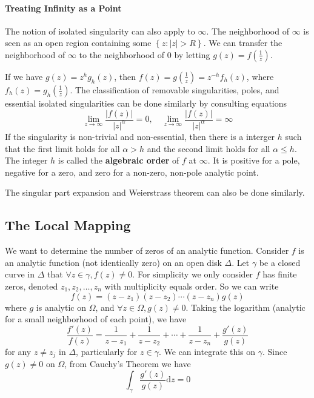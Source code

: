 \documentclass[../main.tex]{subfiles}
\begin{document}
\paragraph{Treating Infinity as a Point}
The notion of isolated singularity can also apply to $\infty $. The neighborhood of $\infty $ is seen as an open region containing some $\left\{ z: \left|z\right|>R \right\}$. We can transfer the neighborhood of $\infty $ to the neighborhood of $0$ by letting $\displaystyle g(z) = f(\frac{1}{z})$.

If we have $g(z) = z^hg_h(z)$, then $f(z) = g(\frac{1}{z}) = z^{-h}f_h(z)$, where $f_h(z) = g_h(\frac{1}{z})$. The classification of removable singularities, poles, and essential isolated singularities can be done similarly by consulting equations
\begin{equation*}
\lim_{z \to \infty} \frac{\left|f(z)\right|}{\left|z\right|^{\alpha}} = 0, \quad \lim_{z \to \infty} \frac{\left|f(z)\right|}{\left|z\right|^{\alpha}} = \infty
\end{equation*}
If the singularity is non-trivial and non-essential, then there is a interger $h$ such that the first limit holds for all $\alpha>h$ and the second limit holds for all $\alpha\leq h$. The integer $h$ is called the \textbf{algebraic order} of $f$ at $\infty $. It is positive for a pole, negative for a zero, and zero for a non-zero, non-pole analytic point.

The singular part expansion and Weierstrass theorem can also be done similarly.


\subsection{The Local Mapping}
We want to determine the number of zeros of an analytic function. Consider $f$ is an analytic function (not identically zero) on an open disk  $\Delta$. Let $\gamma$ be a closed curve in $\Delta$ that $\forall z\in \gamma, f(z)\neq 0$. For simplicity we only consider $f$ has finite zeros, denoted $z_1,z_2, \ldots ,z_n$ with multiplicity equals order. So we can write
\begin{equation}
	f(z) = (z-z_1)(z-z_2)\cdots (z-z_n)g(z)
\end{equation}
where $g$ is analytic on $\Omega$, and $\forall z\in \Omega, g(z)\neq 0$. Taking the logarithm (analytic for a small neighborhood of each point), we have
\begin{equation}
	\frac{f'(z)}{f(z)} = \frac{1}{z-z_1} + \frac{1}{z-z_2} + \cdots + \frac{1}{z-z_n} + \frac{g'(z)}{g(z)}
\end{equation}
for any $z\neq z_j$ in $\Delta$, particularly for $z\in \gamma$. We can integrate this on $\gamma$. Since $g(z)\neq 0$ on $\Omega$, from Cauchy's Theorem we have
\begin{equation*}
\int_{\gamma} \frac{g'(z)}{g(z)} \mathrm{d} z = 0
\end{equation*}
\end{document}
